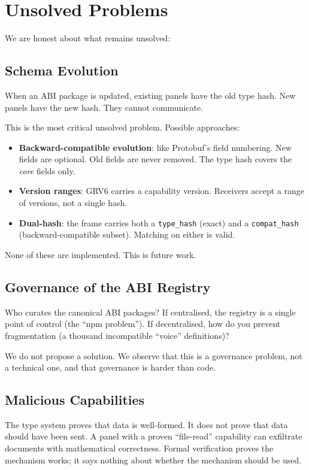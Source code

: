 \documentclass[11pt,a4paper]{article}
\begin{document}
\section{Unsolved Problems}

We are honest about what remains unsolved:

\subsection{Schema Evolution}

When an ABI package is updated, existing panels have the old type hash.
New panels have the new hash. They cannot communicate.

This is the most critical unsolved problem. Possible approaches:
\begin{itemize}
\item \textbf{Backward-compatible evolution}: like Protobuf's field
  numbering. New fields are optional. Old fields are never removed.
  The type hash covers the \emph{core} fields only.
\item \textbf{Version ranges}: GRV6 carries a capability version.
  Receivers accept a range of versions, not a single hash.
\item \textbf{Dual-hash}: the frame carries both a \texttt{type\_hash}
  (exact) and a \texttt{compat\_hash} (backward-compatible subset).
  Matching on either is valid.
\end{itemize}

None of these are implemented. This is future work.

\subsection{Governance of the ABI Registry}

Who curates the canonical ABI packages? If centralised, the registry
is a single point of control (the ``npm problem''). If decentralised,
how do you prevent fragmentation (a thousand incompatible ``voice''
definitions)?

We do not propose a solution. We observe that this is a governance
problem, not a technical one, and that governance is harder than code.

\subsection{Malicious Capabilities}

The type system proves that data is well-formed. It does not prove that
data should have been sent. A panel with a proven ``file-read''
capability can exfiltrate documents with mathematical correctness. Formal
verification proves the mechanism works; it says nothing about whether
the mechanism should be used.
\end{document}
